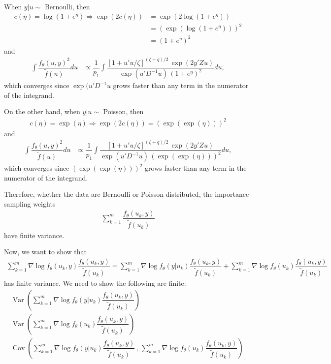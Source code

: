 \documentclass{article}
\DeclareMathOperator{\var}{Var}
\DeclareMathOperator{\cov}{Cov}
\begin{document}
When $y|u\sim$ Bernoulli, then
\begin{align}
c(\eta)=\log(1+e^\eta) \Rightarrow \exp(2c(\eta))&= \exp( 2 \log(1+e^\eta)  )\\
&= ( \exp( \log(1+e^\eta)  )  )^2\\
&= (1+e^\eta) ^2
\end{align}
and
\begin{align}
\int \dfrac{f_\theta(u,y)^2}{\tilde{f}(u)} du &\propto \dfrac{1}{p_1} \int \dfrac{ \left[ 1+u'u/\zeta  \right]^{(\zeta+q)/2} \, \exp(2y'Zu)  }{\exp(u'D^{-1}u)   \,  (1+e^\eta) ^2  } du,
\end{align}
which converges since $\exp(u'D^{-1}u$ grows faster than any term in the numerator of the integrand.

On the other hand, when $y|u\sim$ Poisson, then 
\begin{align}
c(\eta)=\exp(\eta) \Rightarrow \exp(2 c(\eta)) = (\exp(\exp(\eta)))^2
\end{align}
and
\begin{align}
\int \dfrac{f_\theta(u,y)^2}{\tilde{f}(u)} du &\propto \dfrac{1}{p_1} \int \dfrac{ \left[ 1+u'u/\zeta  \right]^{(\zeta+q)/2} \, \exp(2y'Zu)  }{\exp(u'D^{-1}u)   \,   (\exp(\exp(\eta)))^2  } du,
\end{align}
which converges since  $(\exp(\exp(\eta)))^2$ grows faster than any term in the numerator of the integrand.  

Therefore, whether the data are Bernoulli or Poisson distributed, the importance sampling weights 
\begin{align}
\sum_{k=1}^m  \dfrac{f_\theta(u_k,y)}{\tilde{f}(u_k)}
\end{align}
have finite variance.

Now, we want to show that
\begin{align}
\sum_{k=1}^m \nabla \log f_\theta (u_k,y) \dfrac{f_\theta(u_k,y)}{\tilde{f}(u_k)} =\sum_{k=1}^m \nabla \log f_\theta (y|u_k) \dfrac{f_\theta(u_k,y)}{\tilde{f}(u_k)} +\sum_{k=1}^m \nabla \log f_\theta (u_k) \dfrac{f_\theta(u_k,y)}{\tilde{f}(u_k)} 
\end{align}
 has finite variance. We need to show the following are finite:
\begin{align}
\var \left( \sum_{k=1}^m \nabla \log f_\theta (y|u_k) \dfrac{f_\theta(u_k,y)}{\tilde{f}(u_k)}   \right) \\
\var \left(\sum_{k=1}^m \nabla \log f_\theta (u_k) \dfrac{f_\theta(u_k,y)}{\tilde{f}(u_k)} \right)\\
\cov \left(\sum_{k=1}^m \nabla \log f_\theta (y|u_k) \dfrac{f_\theta(u_k,y)}{\tilde{f}(u_k)} \, , \, \sum_{k=1}^m \nabla \log f_\theta (u_k) \dfrac{f_\theta(u_k,y)}{\tilde{f}(u_k)} \right)_.
\end{align}
\end{document}
